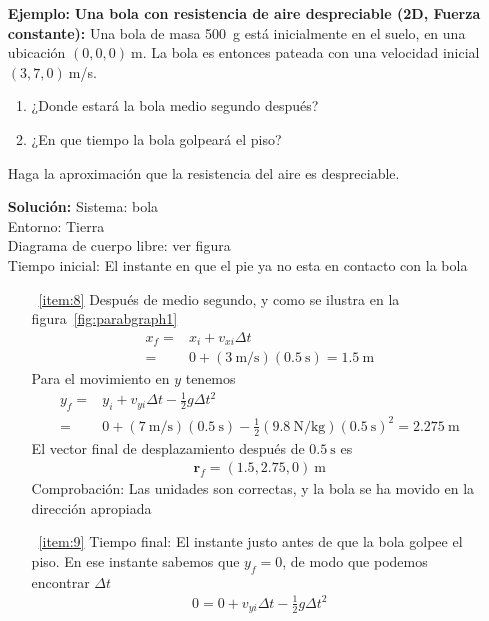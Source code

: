 \begin{itemize}
\item[\textbf{Ejemplo:}] \textbf{Una bola con resistencia de aire despreciable (2D, Fuerza constante):}
Una bola de masa 500~g está inicialmente en el suelo, en una ubicación $(0,0,0)\ $m. La bola es entonces pateada con una velocidad inicial $(3,7,0)\ $m/s.
\begin{enumerate}
\item ¿Donde estará la bola medio segundo después?
\label{item:8}
\item ¿En que tiempo la bola golpeará el piso?
\label{item:9}
\end{enumerate}
Haga la aproximación que la resistencia del aire es despreciable.


\item[\textbf{Solución:}] Sistema: bola\\
Entorno: Tierra\\
Diagrama de cuerpo libre: ver figura\\
Tiempo inicial: El instante en que el pie ya no esta en contacto con la bola
\begin{itemize}
\item[~\ref{item:8}]
Después de medio segundo, y como se ilustra en la figura~\ref{fig:parabgraph1}
\begin{align}
  x_f=&x_i+v_{xi}\Delta t\nonumber\\
  =&0+(3\ \text{m/s})(0.5\ \text{s})=1.5\ \text{m}
\end{align}
Para el movimiento en $y$ tenemos
\begin{align}
  y_f=&y_i+v_{yi}\Delta t-\frac{1}{2}g \Delta t^2\nonumber\\
=& 0+(7\ \text{m/s})(0.5\ \text{s})-\frac{1}{2}(9.8\ \text{N/kg})(0.5\ \text{s})^2=2.275\ \text{m}
\end{align}
El vector final de desplazamiento después de $\SI{0.5}{\second}$ es
\begin{align}
  \mathbf{r}_f=(1.5,2.75,0)\ \text{m}
\end{align}
Comprobación: Las unidades son correctas, y la bola se ha movido en la dirección apropiada
\item[~\ref{item:9}] Tiempo final: El instante justo antes de que la bola golpee el piso. En ese instante sabemos que $y_f=0$, de modo que podemos encontrar $\Delta t$
  \begin{align*}
    0=0+v_{yi}\Delta t-\frac{1}{2}g\Delta t^2
  \end{align*}
  \begin{align*}

\end{align*}
\end{itemize}
\end{itemize}
